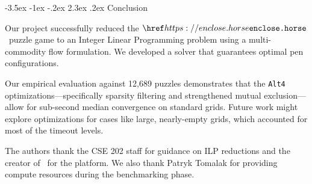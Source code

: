\documentclass[sigconf,nonacm]{acmart}
\makeatletter
\renewcommand{\section}{\@startsection{section}{1}{\z@}%
  {-3.5ex \@plus -1ex \@minus -.2ex}%
  {2.3ex \@plus.2ex}%
  {\reset@font\Large\bfseries}}
\renewcommand{\subsection}{\@startsection{subsection}{2}{\z@}%
  {-3.25ex\@plus -1ex \@minus -.2ex}%
  {1.5ex \@plus .2ex}%
  {\reset@font\large\bfseries}}
\makeatother
\begin{document}


\section{Conclusion}

Our project successfully reduced the $\horse$\ puzzle game to an Integer Linear Programming problem using a multi-commodity flow formulation. We developed a solver that guarantees optimal pen configurations. 

Our empirical evaluation against 12,689 puzzles demonstrates that the \texttt{Alt4} optimizations—specifically sparsity filtering and strengthened mutual exclusion—allow for sub-second median convergence on standard grids. Future work might explore optimizations for cases like large, nearly-empty grids, which accounted for most of the timeout levels.

\begin{acks}
The authors thank the CSE 202 staff for guidance on ILP reductions and the creator of \horse\ for the platform. We also thank Patryk Tomalak for providing compute resources during the benchmarking phase. 
\end{acks}

\nocite{*}


\end{document}
